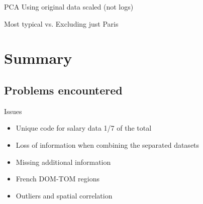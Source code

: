 \documentclass[12pt]{beamer}
\begin{document}
\begin{frame}{\textcolor{bscuro}{PCA}}
	Using original data scaled (not logs)
	
	Most typical vs. Excluding just Paris
	\begin{figure} 
		\centering
	\end{figure}
\end{frame}


\section{Summary}


\subsection{Problems encountered}


\begin{frame}{\textcolor{bscuro}{Issues}}
	\begin{itemize}
		\item Unique code for salary data 1/7 of the total 
		\item Loss of information when combining the separated datasets
		\item Missing additional information 
		\item French DOM-TOM regions
		\item Outliers and spatial correlation
	\end{itemize}
\end{frame}			
\end{document}
